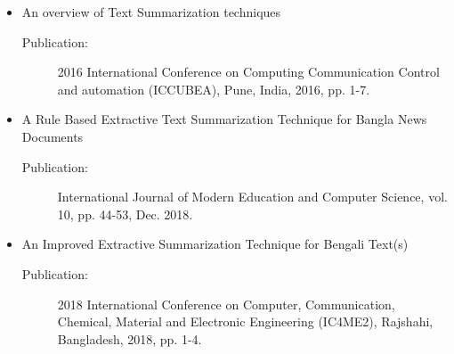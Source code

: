 \documentclass[12pt]{report}
\begin{document}
\begin{itemize}
\begin{description}
        \end{description}
    \item An overview of Text Summarization techniques \cite{andhale2016overview}
        \begin{description}
            \item[Publication:] 2016 International Conference on Computing Communication Control and automation (ICCUBEA), Pune, India, 2016, pp. 1-7.
        \end{description}
    \item A Rule Based Extractive Text Summarization Technique for Bangla News Documents \cite{ghosh2018rule}
        \begin{description}
            \item[Publication:] International Journal of Modern Education and Computer Science, vol. 10, pp. 44-53, Dec. 2018.
        \end{description}
    \item An Improved Extractive Summarization Technique for Bengali Text(s) \cite{tumpa2018improved}
        \begin{description}
            \item[Publication:] 2018 International Conference on Computer, Communication, Chemical, Material and Electronic Engineering (IC4ME2), Rajshahi, Bangladesh, 2018, pp. 1-4.
        \end{description}
\end{itemize}
\end{document}
